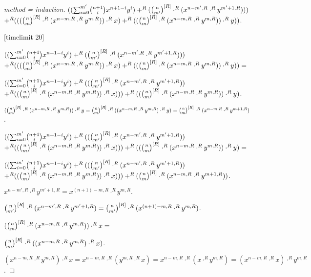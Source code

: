 \documentclass[english,11pt]{article}
\begin{document}
\begin{forthel}
\begin{proof}[method = induction]
$ ((\binsum{m'}{n+1}{x}{y}{R}) +^{R} (\cho{n}{m'}^{[R]} \cdot^{R} (x^{n-m',R} \cdot^{R} y^{m'+1,R}))) $
$ +^{R} 
(((\cho{n}{m}^{[R]} \cdot^{R} (x^{n - m,R} \cdot^{R} y^{m,R})) \cdot^{R} x)
   +^{R} ((\cho{n}{m}^{[R]} \cdot^{R} (x^{n - m,R} \cdot^{R} y^{m,R})) \cdot^{R} y)) $.

[timelimit 20]

$ ((\binsum{m'}{n+1}{x}{y}{R}) +^{R} (\cho{n}{m'}^{[R]} \cdot^{R} (x^{n-m',R} \cdot^{R} y^{m'+1,R}))) $
$ +^{R} 
(((\cho{n}{m}^{[R]} \cdot^{R} (x^{n - m,R} \cdot^{R} y^{m,R})) \cdot^{R} x)
   +^{R} ((\cho{n}{m}^{[R]} \cdot^{R} (x^{n - m,R} \cdot^{R} y^{m,R})) \cdot^{R} y)) =$

$ ((\binsum{m'}{n+1}{x}{y}{R}) +^{R} ((\cho{n}{m'}^{[R]} \cdot^{R} (x^{n-m',R} \cdot^{R} y^{m'+1,R})) $
$ +^{R} 
((\cho{n}{m}^{[R]} \cdot^{R} (x^{n - m,R} \cdot^{R} y^{m,R})) \cdot^{R} x)))
   +^{R} ((\cho{n}{m}^{[R]} \cdot^{R} (x^{n - m,R} \cdot^{R} y^{m,R})) \cdot^{R} y) $.

$(\cho{n}{m}^{[R]} \cdot^{R} (x^{n - m,R} \cdot^{R} y^{m,R})) \cdot^{R} y =
\cho{n}{m}^{[R]} \cdot^{R} ((x^{n - m,R} \cdot^{R} y^{m,R}) \cdot^{R} y) =
\cho{n}{m}^{[R]} \cdot^{R} (x^{n - m,R} \cdot^{R} y^{m+1,R})$.


$ ((\binsum{m'}{n+1}{x}{y}{R}) +^{R} ((\cho{n}{m'}^{[R]} \cdot^{R} (x^{n-m',R} \cdot^{R} y^{m'+1,R})) $
$ +^{R} 
((\cho{n}{m}^{[R]} \cdot^{R} (x^{n - m,R} \cdot^{R} y^{m,R})) \cdot^{R} x)))
   +^{R} ((\cho{n}{m}^{[R]} \cdot^{R} (x^{n - m,R} \cdot^{R} y^{m,R})) \cdot^{R} y) =$

$ ((\binsum{m'}{n+1}{x}{y}{R}) +^{R} ((\cho{n}{m'}^{[R]} \cdot^{R} (x^{n-m',R} \cdot^{R} y^{m'+1,R})) $
$ +^{R} 
((\cho{n}{m}^{[R]} \cdot^{R} (x^{n - m,R} \cdot^{R} y^{m,R})) \cdot^{R} x)))
   +^{R} (\cho{n}{m}^{[R]} \cdot^{R} (x^{n - m,R} \cdot^{R} y^{m+1,R})) $.

$x^{n-m',R} \cdot^{R} y^{m'+1,R} = x^{(n+1)-m,R} \cdot^{R} y^{m,R}.$

$\cho{n}{m'}^{[R]} \cdot^{R} (x^{n-m',R} \cdot^{R} y^{m'+1,R}) = 
\cho{n}{m'}^{[R]} \cdot^{R} (x^{(n+1)-m,R} \cdot^{R} y^{m,R})$.

$(\cho{n}{m}^{[R]} \cdot^{R} (x^{n - m,R} \cdot^{R} y^{m,R})) \cdot^{R} x = $

$\cho{n}{m}^{[R]} \cdot^{R} ((x^{n - m,R} \cdot^{R} y^{m,R}) \cdot^{R} x)$.

$(x^{n - m,R} \cdot^{R} y^{m,R}) \cdot^{R} x = 
x^{n - m,R} \cdot^{R} (y^{m,R} \cdot^{R} x) =
x^{n - m,R} \cdot^{R} (x \cdot^{R} y^{m,R}) =
(x^{n - m,R} \cdot^{R} x) \cdot^{R} y^{m,R}$.


\end{proof}
\end{forthel}
\end{document}
